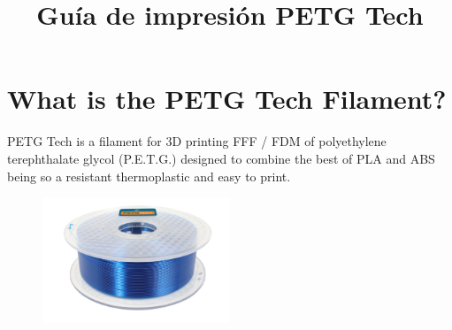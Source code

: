 \documentclass[11pt,a4paper]{article}
\title{Guía de impresión PETG Tech}
\date{}
\begin{document}

\section{What is the PETG Tech Filament?}PETG Tech is a filament for 3D printing FFF / FDM of polyethylene terephthalate glycol (P.E.T.G.) designed to combine the best of PLA and ABS being so a resistant thermoplastic and easy to print.
\begin{figure}[H]
\centering
\includegraphics[width=0.5\textwidth,cfbox=azul_marcos 1pt 0pt]{FOTOS/PETGKILOAZUL}
\end{figure}
\end{document}
